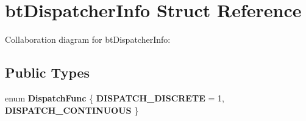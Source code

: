 \hypertarget{structbt_dispatcher_info}{\section{bt\+Dispatcher\+Info Struct Reference}
\label{structbt_dispatcher_info}
}


Collaboration diagram for bt\+Dispatcher\+Info\+:
\subsection*{Public Types}
\begin{DoxyCompactItemize}
\item 
\hypertarget{structbt_dispatcher_info_a04d1f989a83ef1bb12cf7f4837de8cea}{enum {\bfseries Dispatch\+Func} \{ {\bfseries D\+I\+S\+P\+A\+T\+C\+H\+\_\+\+D\+I\+S\+C\+R\+E\+T\+E} = 1, 
{\bfseries D\+I\+S\+P\+A\+T\+C\+H\+\_\+\+C\+O\+N\+T\+I\+N\+U\+O\+U\+S}
 \}}\label{structbt_dispatcher_info_a04d1f989a83ef1bb12cf7f4837de8cea}

\end{DoxyCompactItemize}
